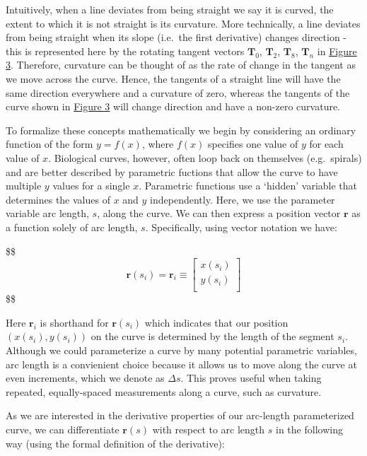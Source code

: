 \documentclass[]{article}
\begin{document}
Intuitively, when a line deviates from being straight we say it is
curved, the extent to which it is not straight is its curvature. More
technically, a line deviates from being straight when its slope
(i.e.~the first derivative) changes direction - this is represented here
by the rotating tangent vectors \(\mathbf{T}_0\), \(\mathbf{T}_2\),
\(\mathbf{T}_8\), \(\mathbf{T}_n\) in \href{Figure_3.jpg}{Figure 3}.
Therefore, curvature can be thought of as the rate of change in the
tangent as we move across the curve. Hence, the tangents of a straight
line will have the same direction everywhere and a curvature of zero,
whereas the tangents of the curve shown in \href{Figure_3.jpg}{Figure 3}
will change direction and have a non-zero curvature.

To formalize these concepts mathematically we begin by considering an
ordinary function of the form \(y=f(x)\), where \(f(x)\) specifies one
value of \(y\) for each value of \(x\). Biological curves, however,
often loop back on themselves (e.g.~spirals) and are better described by
parametric fuctions that allow the curve to have multiple \(y\) values
for a single \(x\). Parametric functions use a `hidden' variable that
determines the values of \(x\) and \(y\) independently. Here, we use the
parameter variable arc length, \(s\), along the curve. We can then
express a position vector \(\mathbf{r}\) as a function solely of arc
length, \(s\). Specifically, using vector notation we have:

\$\$ \begin{equation}
\tag{1}

\mathbf{r}(s_i) =
\mathbf{r}_i \equiv \left[\begin{array}
{rrr}
x(s_i) \\
y(s_i) \\
\end{array}\right]

\end{equation} \$\$

Here \(\mathbf{r}_i\) is shorthand for \(\mathbf{r}(s_i)\) which
indicates that our position \((x(s_i), y(s_i))\) on the curve is
determined by the length of the segment \(s_i\). Although we could
parameterize a curve by many potential parametric variables, arc length
is a convienient choice because it allows us to move along the curve at
even increments, which we denote as \(\Delta s\). This proves useful
when taking repeated, equally-spaced measurements along a curve, such as
curvature.

As we are interested in the derivative properties of our arc-length
parameterized curve, we can differentiate \(\mathbf{r}(s)\) with respect
to arc length \(s\) in the following way (using the formal definition of
the derivative):
\end{document}
